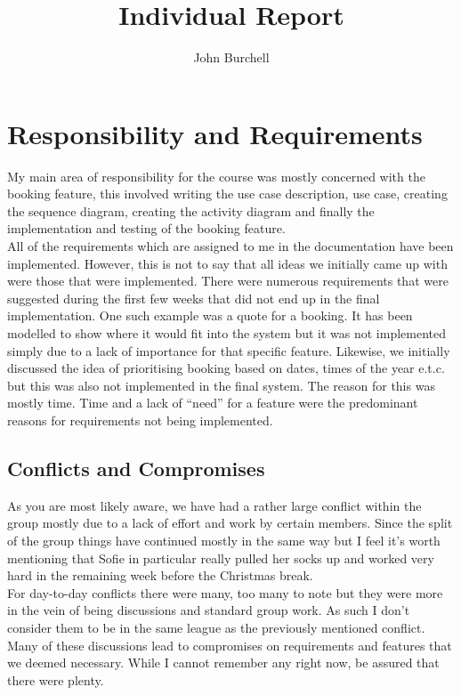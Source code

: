\documentclass{article}
\begin{document}
\title{Individual Report}

\author{John Burchell}
\maketitle

\section*{Responsibility and Requirements}
My main area of responsibility for the course was mostly concerned with the booking feature, this involved writing the use case description, use case, creating the sequence diagram, creating the activity diagram and finally the implementation and testing of the booking feature.
\\

All of the requirements which are assigned to me in the documentation have been implemented. However, this is not to say that all ideas we initially came up with were those that were implemented. There were numerous requirements that were suggested during the first few weeks that did not end up in the final implementation. One such example was a quote for a booking. It has been modelled to show where it would fit into the system but it was not implemented simply due to a lack of importance for that specific feature. Likewise, we initially discussed the idea of prioritising booking based on dates, times of the year e.t.c. but this was also not implemented in the final system. The reason for this was mostly time. Time and a lack of ``need'' for a feature were the predominant reasons for requirements not being implemented.
\\

\subsection*{Conflicts and Compromises}
As you are most likely aware, we have had a rather large conflict within the group mostly due to a lack of effort and work by certain members. Since the split of the group things have continued mostly in the same way but I feel it's worth mentioning that Sofie in particular really pulled her socks up and worked very hard in the remaining week before the Christmas break. 
\\

For day-to-day conflicts there were many, too many to note but they were more in the vein of being discussions and standard group work. As such I don't consider them to be in the same league as the previously mentioned conflict. Many of these discussions lead to compromises on requirements and features that we deemed necessary. While I cannot remember any right now, be assured that there were plenty.
\\
\end{document}

